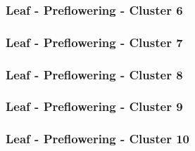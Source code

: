 

\clearpage

\subsubsection{Leaf - Preflowering - Cluster 6}

\vspace{1em}



\clearpage

\subsubsection{Leaf - Preflowering - Cluster 7}

\vspace{1em}



\clearpage

\subsubsection{Leaf - Preflowering - Cluster 8}

\vspace{1em}



\clearpage

\subsubsection{Leaf - Preflowering - Cluster 9}

\vspace{1em}



\clearpage

\subsubsection{Leaf - Preflowering - Cluster 10}

\vspace{1em}



